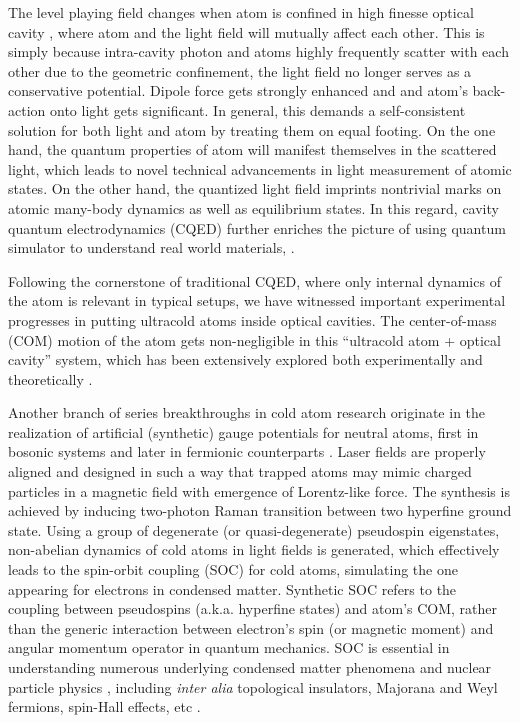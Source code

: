 \documentclass[journal,article,accept,moreauthors,pdftex,12pt,a4paper]{mdpi}
\begin{document}
The level playing field changes when atom is confined in high finesse optical cavity \cite{cavity1, cavity2, cavity3}, where atom and the light field will mutually affect each other. This is simply because intra-cavity photon and atoms highly frequently scatter with each other due to the geometric confinement, the light field no longer serves as a conservative potential. Dipole force gets strongly enhanced and and atom's back-action onto light gets significant. In general, this demands a self-consistent solution for both light and atom by treating them on equal footing. On the one hand, the quantum properties of atom will manifest themselves in the scattered light, which leads to novel technical advancements in light measurement of atomic states. On the other hand, the quantized light field imprints nontrivial marks on atomic many-body dynamics as well as equilibrium states. In this regard, cavity quantum electrodynamics (CQED) further enriches the picture of using quantum simulator to understand real world materials, \cite{cavity4, cavity5, cavity6}. 

Following the cornerstone of traditional CQED, where only internal dynamics of the atom is relevant in typical setups, we have witnessed important experimental progresses in putting ultracold atoms inside optical cavities. The center-of-mass (COM) motion of the atom gets non-negligible in this ``ultracold atom + optical cavity'' system, which has been extensively explored both experimentally \cite{cavity7, cavity8, cavity9, cavity10, cavity11} and theoretically \cite{cavity12, cavity13}. 

Another branch of series breakthroughs in cold atom research originate in the realization of artificial (synthetic) gauge potentials for neutral atoms, first in bosonic systems \cite{soc1, soc2} and later in fermionic counterparts \cite{soc3, soc4}. Laser fields are properly aligned and designed in such a way that trapped atoms may mimic charged particles in a magnetic field with emergence of Lorentz-like force. The synthesis is achieved by inducing two-photon Raman transition between two hyperfine ground state. Using a group of degenerate (or quasi-degenerate) pseudospin eigenstates, non-abelian dynamics of cold atoms in light fields is generated, which effectively leads to the spin-orbit coupling (SOC) for cold atoms, simulating the one appearing for electrons in condensed matter. Synthetic SOC refers to the coupling between pseudospins (a.k.a. hyperfine states) and atom's COM, rather than the generic interaction between electron's spin (or magnetic moment) and angular momentum operator in quantum mechanics. SOC is essential in understanding numerous underlying condensed matter phenomena and nuclear particle physics \cite{socVictor}, including {\em inter alia} topological insulators, Majorana and Weyl fermions, spin-Hall effects, etc \cite{TI, MF, WF, SHE1, SHE2}. 
\end{document}

